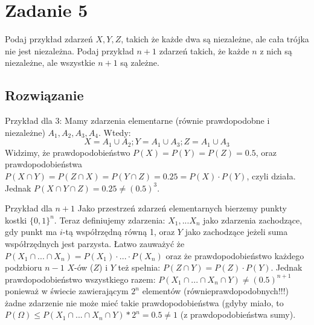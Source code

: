 \section{Zadanie 5}
Podaj przykład zdarzeń \(X, Y, Z\), takich że każde dwa są niezależne, ale cała trójka nie jest niezależna. Podaj przykład \(n+1\) zdarzeń takich, że każde \(n\) z nich są niezależne, ale wszystkie \(n+1\) są zależne.

\subsection*{Rozwiązanie}
Przykład dla 3:
Mamy zdarzenia elementarne (równie prawdopodobne i niezależne) \(A_1, A_2, A_3, A_4\). Wtedy:
\[X = A_1 \cup A_2; Y = A_1 \cup A_3; Z = A_1 \cup A_3\]
Widzimy, że prawdopodobieństwo \(P(X)=P(Y)=P(Z) = 0.5\), oraz prawdopodobieństwa \(P(X \cap Y) = P(Z \cap X)= P(Y \cap Z) = 0.25 = P(X) \cdot P(Y)\), czyli działa. Jednak \(P(X\cap Y \cap Z) = 0.25 \neq (0.5)^3\).

Przykład dla \(n+1\)
Jako przestrzeń zdarzeń elementarnych bierzemy punkty kostki \(\{0,1\}^n\). Teraz definiujemy zdarzenia:
\(X_1, ... X_n\) jako zdarzenia zachodzące, gdy punkt ma \(i\)-tą współrzędną równą 1, oraz \(Y\) jako zachodzące jeżeli suma współrzędnych jest parzysta. Łatwo zauważyć że \(P(X_1 \cap ...\cap X_n) = P(X_1) \cdot ... \cdot P(X_n)\) oraz że prawdopodobieństwo każdego podzbioru \(n-1\) \(X\)-ów (\(Z\)) i \(Y\) też spełnia: \(P(Z \cap Y) = P(Z)\cdot P(Y)\). Jednak prawdopodobieństwo wszystkiego razem: \(P(X_1 \cap ...\cap X_n \cap Y) \neq (0.5)^{n+1}\) ponieważ w świecie zawierającym \(2^n\) elementów (równieprawdopodobnych!!!) żadne zdarzenie nie może mieć takie prawdopodobieństwa (gdyby miało, to \(P(\Omega) \leq P(X_1 \cap ...\cap X_n \cap Y)*2^n = 0.5 \neq 1\) (z prawdopodobieństwa sumy).
